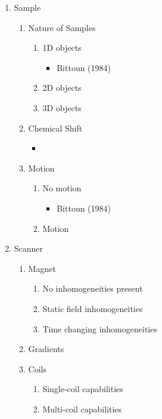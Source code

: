 \documentclass[11pt]{article}
\begin{document}
\begin{enumerate}

	\item Sample
	\begin{enumerate}
		\item Nature of Samples
		\begin{enumerate}
			\item 1D objects
			\begin{itemize}
				\item Bittoun (1984)
			\end{itemize}
			
			\item 2D objects
			\item 3D objects
		\end{enumerate}
		
		\item Chemical Shift
		\begin{itemize}
			\item 
		\end{itemize}
		
		\item Motion
		\begin{enumerate}
			\item No motion
			\begin{itemize}
				\item Bittoun (1984)
			\end{itemize}
			
			\item Motion
			
		\end{enumerate}
		
	\end{enumerate}
	
	
	\item Scanner
	\begin{enumerate}
		\item Magnet
		\begin{enumerate}
			\item No inhomogeneities present
			\item Static field inhomogeneities
			\item Time changing inhomogeneities
		\end{enumerate}
		
		\item Gradients
		
		\item Coils
		\begin{enumerate}
			\item Single-coil capabilities
			\item Multi-coil capabilities
		\end{enumerate}
		

\end{enumerate}
\end{enumerate}
\end{document}
